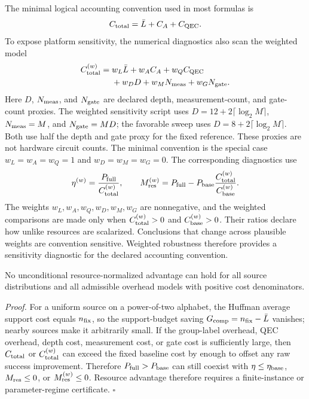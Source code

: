 The minimal logical accounting convention used in most formulas is
\begin{equation}
    C_{\rm total}=\bar L+C_A+C_{\rm QEC}.
\end{equation}
To expose platform sensitivity, the numerical diagnostics also scan the weighted model
\begin{equation}
    \begin{split}
    C_{\rm total}^{(w)}
    ={}& w_L\bar L+w_AC_A+w_QC_{\rm QEC}\\
    &+w_DD+w_MN_{\rm meas}+w_GN_{\rm gate}.
    \end{split}
    \label{eq:weighted_resource_model}
\end{equation}
Here $D$, $N_{\rm meas}$, and $N_{\rm gate}$ are declared depth, measurement-count, and gate-count proxies. The weighted sensitivity script uses $D=12+2\lceil\log_2 M\rceil$, $N_{\rm meas}=M$, and $N_{\rm gate}=MD$; the favorable sweep uses $D=8+2\lceil\log_2 M\rceil$. Both use half the depth and gate proxy for the fixed reference. These proxies are not hardware circuit counts. The minimal convention is the special case \(w_L=w_A=w_Q=1\) and \(w_D=w_M=w_G=0\). The corresponding diagnostics use
\begin{equation}
    \eta^{(w)}=\frac{P_{\rm full}}{C_{\rm total}^{(w)}},
    \qquad
    M_{\rm res}^{(w)}
    =
    P_{\rm full}
    -
    P_{\rm base}\frac{C_{\rm total}^{(w)}}{C_{\rm base}^{(w)}}.
\end{equation}
The weights \(w_L,w_A,w_Q,w_D,w_M,w_G\) are nonnegative, and the weighted comparisons are made only when \(C_{\rm total}^{(w)}>0\) and \(C_{\rm base}^{(w)}>0\). Their ratios declare how unlike resources are scalarized. Conclusions that change across plausible weights are convention sensitive. Weighted robustness therefore provides a sensitivity diagnostic for the declared accounting convention.

\begin{proposition}\label{prop:no-free-lunch}\hfill\par
No unconditional resource-normalized advantage can hold for all source distributions and all admissible overhead models with positive cost denominators.
\end{proposition}
\textit{Proof.} For a uniform source on a power-of-two alphabet, the Huffman average support cost equals \(n_{\rm fix}\), so the support-budget saving \(G_{\rm comp}=n_{\rm fix}-\bar L\) vanishes; nearby sources make it arbitrarily small. If the group-label overhead, QEC overhead, depth cost, measurement cost, or gate cost is sufficiently large, then \(C_{\rm total}\) or \(C_{\rm total}^{(w)}\) can exceed the fixed baseline cost by enough to offset any raw success improvement. Therefore \(P_{\rm full}>P_{\rm base}\) can still coexist with \(\eta\le\eta_{\rm base}\), \(M_{\rm res}\le0\), or \(M_{\rm res}^{(w)}\le0\). Resource advantage therefore requires a finite-instance or parameter-regime certificate. \(\square\)


